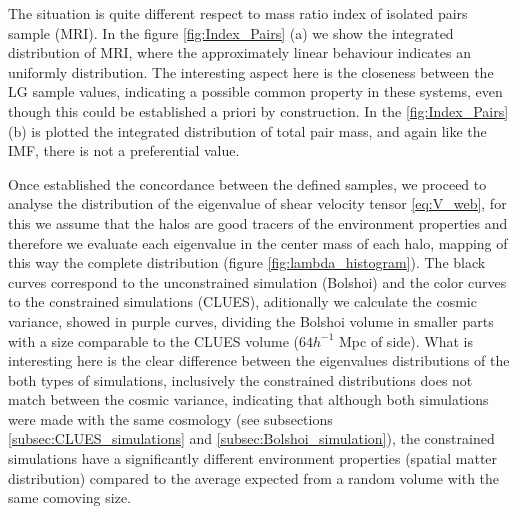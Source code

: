 \documentclass[usenatbib]{mn2e}
\begin{document}
The situation is quite different respect to mass ratio index of isolated 
pairs sample (MRI). In the figure \ref{fig:Index_Pairs} (a) we show the 
integrated distribution of MRI, where the approximately linear behaviour 
indicates an uniformly distribution. The interesting aspect here is the 
closeness between the LG sample values, indicating a possible common 
property in these systems, even though this could be established a priori 
by construction. In the \ref{fig:Index_Pairs} (b) is plotted the 
integrated distribution of total pair mass, and again like the IMF, there 
is not a preferential value.


Once established the concordance between the defined samples, we proceed 
to analyse the distribution of the eigenvalue of shear velocity tensor 
\ref{eq:V_web}, for this we assume that the halos are good tracers of the 
environment properties and therefore we evaluate each eigenvalue in the 
center mass of each halo, mapping of this way the complete distribution 
(figure \ref{fig:lambda_histogram}). The black curves correspond to the 
unconstrained simulation (Bolshoi) and the color curves to the constrained 
simulations (CLUES), aditionally we calculate the cosmic variance, showed 
in purple curves, dividing the Bolshoi volume in smaller parts with a size 
comparable to the CLUES volume ($64 h^{-1 }$ Mpc of side). What is 
interesting here is the clear difference between the eigenvalues 
distributions of the both types of simulations, inclusively the 
constrained distributions does not match between the cosmic variance, 
indicating that although both simulations were made with the same cosmology 
(see subsections \ref{subsec:CLUES_simulations} and 
\ref{subsec:Bolshoi_simulation}), the constrained simulations have a 
significantly different environment properties (spatial matter distribution) 
compared to the average expected from a random volume with the same 
comoving size.
\end{document}
